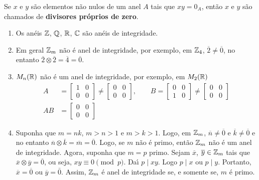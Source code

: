\begin{observacao}
	Se $x$ e $y$ s{\~a}o elementos n{\~a}o nulos de um anel $A$ tais que $xy = 0_A$, ent{\~a}o $x$ e $y$ s{\~a}o chamados de \textbf{divisores pr{\'o}prios de zero}.
\end{observacao}


\begin{exemplos}
	\begin{enumerate}[label={\arabic*})]
		\item Os an{\'e}is $\mathbb{Z}$, $\mathbb{Q}$, $\mathbb{R}$, $\mathbb{C}$ s{\~a}o an{\'e}is de integridade.
		
		\item Em geral $\mathbb{Z}_m$ n{\~a}o {\'e} anel de integridade, por exemplo, em $\mathbb{Z}_4$, $\overline{2} \neq \overline{0}$, no entanto $\overline{2}\otimes \overline{2} = \overline{4} = \overline{0}$.
		
		\item $M_{n}(\mathbb{R})$ n{\~a}o {\'e} um anel de integridade, por exemplo, em $M_{2}(\mathbb{R})$
		\begin{align*}
			A &= \begin{bmatrix}
				1 & 0\\
				0 & 0
			\end{bmatrix} \neq \begin{bmatrix}
				0 & 0\\
				0 & 0		
			\end{bmatrix},\qquad 
			B = \begin{bmatrix}
				0 & 0\\
				1 & 0
			\end{bmatrix} \neq \begin{bmatrix}
				0 & 0\\
				0 & 0
			\end{bmatrix}\\
			AB & =\begin{bmatrix}
				0 & 0\\
				0 & 0
			\end{bmatrix}
		\end{align*}

		\item Suponha que $m = nk$, $m > n > 1$ e $m > k > 1$. Logo, em $\mathbb{Z}_m$, $\overline{n} \neq \overline{0}$ e $\overline{k} \neq \overline{0}$ e no entanto $\overline{n} \otimes \overline{k} = \overline{m} = \overline{0}$. Logo, se $m$ n{\~a}o {\'e} primo, ent{\~a}o $\mathbb{Z}_m$ n{\~a}o {\'e} um anel de integridade. Agora, suponha que $m = p$ primo. Sejam $\overline{x}$, $\overline{y} \in \mathbb{Z}_m$ tais que $\overline{x}\otimes \overline{y} = \overline{0}$, ou seja, $xy \equiv 0 \pmod p$. Da{\'\i} $p\mid xy$. Logo $p\mid x$ ou $p\mid y$. Portanto, $\overline{x} = \overline{0}$ ou $\overline{y} = \bar{0}$. Assim, $\mathbb{Z}_m$ {\'e} anel de integridade se, e somente se, $m$ {\'e} primo.
	\end{enumerate}
\end{exemplos}



